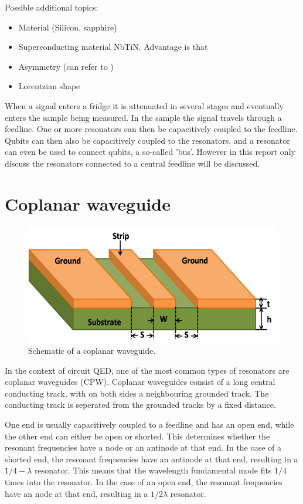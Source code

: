 \documentclass[12pt]{report}
\begin{document}
Possible additional topics:
\begin{itemize}
    \item Material (Silicon, sapphire)
    \item Superconducting material NbTiN. Advantage is that
    \item Asymmetry (can refer to \cite[p.~192]{Geerlings})
    \item Lorentzian shape
\end{itemize}


When a signal enters a fridge it is attenuated in several stages and eventually enters the sample being measured. In the sample the signal travels through a feedline. One or more resonators can then be capacitively coupled to the feedline. Qubits can then also be capacitively coupled to the resonators, and a resonator can even be used to connect qubits, a so-called 'bus'. However in this report only discuss the resonators connected to a central feedline will be discussed.









\section{Coplanar waveguide}

\begin{figure}
    \begin{center}
        \includegraphics[width=.4\textwidth]{Figures/CPW.png}
    \end{center}
    \caption{Schematic of a coplanar waveguide.}
    \label{fig:CPW}
\end{figure}

In the context of circuit QED, one of the most common types of resonators are coplanar waveguides (CPW). Coplanar waveguides consist of a long central conducting track, with on both sides a neighbouring grounded track. The conducting track is seperated from the grounded tracks by a fixed distance.

One end is usually capacitively coupled to a feedline and has an open end, while the other end can either be open or shorted. This determines whether the resonant frequencies have a node or an antinode at that end. In the case of a shorted end, the resonant frequencies have an antinode at that end, resulting in a  $1/4 - \lambda$ resonator. This means that the wavelength fundamental mode fits $1/4$ times into the resonator. In the case of an open end, the resonant frequencies have an node at that end, resulting in a $1/2 \lambda$ resonator.
\end{document}
